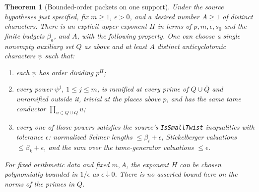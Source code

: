 \documentclass[11pt]{article}
\newtheorem{theorem}{Theorem}[section]
\theoremstyle{remark}\newtheorem{remark}[theorem]{Remark}
\begin{document}
\begin{theorem}[Bounded-order packets on one support]\label{thm:arith}
Under the source hypotheses just specified, fix $m\ge1$, $\epsilon>0$,
and a desired number $A\ge1$ of distinct characters. There is an
explicit upper exponent $H$ in terms of $p,m,\epsilon,s_0$ and the
finite budgets $\beta_a$, and $A$, with the following property.
One can choose a single nonempty auxiliary set $Q$ as above and at least
$A$ distinct anticyclotomic characters $\psi$ such that:
\begin{enumerate}
\item each $\psi$ has order dividing $p^H$;
\item every power $\psi^j$, $1\le j\le m$, is ramified at every
prime of $Q\cup\overline Q$ and unramified outside it, trivial at the
places above $p$, and has the same tame conductor
$\prod_{u\in Q\cup\overline Q}u$;
\item every one of those powers satisfies the source's
\texttt{IsSmallTwist} inequalities with tolerance $\epsilon$: normalized
Selmer lengths $\le\beta_i+\epsilon$, Stickelberger valuations
$\le\beta_k+\epsilon$, and the sum over the tame-generator valuations
$\le\epsilon$.
\end{enumerate}
For fixed arithmetic data and fixed $m,A$, the exponent $H$ can be
chosen polynomially bounded in $1/\epsilon$ as $\epsilon\downarrow0$.
There is no asserted bound here on the norms of the primes in $Q$.
\end{theorem}
\end{document}
